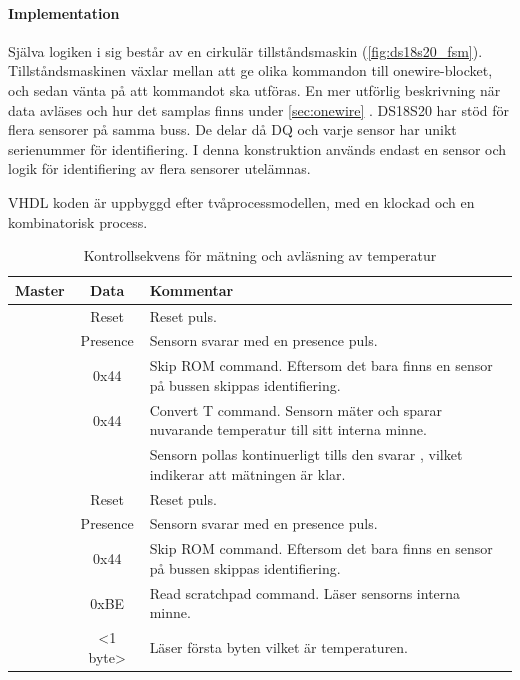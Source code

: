 \paragraph{Implementation}
Själva logiken i sig består av en cirkulär tillståndsmaskin (\autoref{fig:ds18s20_fsm}).
Tillståndsmaskinen växlar mellan att ge olika kommandon till onewire-blocket, och sedan vänta på att kommandot ska utföras. En mer utförlig beskrivning när data avläses och hur det samplas finns under \ref{sec:onewire} .
DS18S20 har stöd för flera sensorer på samma buss. De delar då DQ och varje sensor har unikt serienummer för identifiering. I denna konstruktion används endast en sensor och logik för identifiering av flera sensorer utelämnas.

VHDL koden är uppbyggd efter tvåprocessmodellen, med en klockad och en kombinatorisk process.


\begin{table}[H]

\begin{tabularx}{\textwidth}[h]{c c X}
	\hline
	\textbf{Master} & \textbf{Data} & \textbf{Kommentar} \\
	\hline

	\Tx & Reset & Reset puls.\\
	\Rx & Presence & Sensorn svarar med en presence puls.\\
	\Tx & 0x44 & Skip ROM command. Eftersom det bara finns en sensor på bussen skippas identifiering.\\
	\Tx & 0x44 & Convert T command. Sensorn mäter och sparar nuvarande temperatur till sitt interna minne.\\
	\Rx & & Sensorn pollas kontinuerligt tills den svarar \high{}, vilket indikerar att mätningen är klar.\\
	\Tx & Reset & Reset puls.\\
	\Rx & Presence & Sensorn svarar med en presence puls.\\
	\Tx & 0x44 & Skip ROM command. Eftersom det bara finns en sensor på bussen skippas identifiering.\\
	\Tx & 0xBE & Read scratchpad command. Läser sensorns interna minne.  \\
	\Rx & <1 byte> & Läser första byten vilket är temperaturen.\\

	\hline
\end{tabularx}
\caption{Kontrollsekvens för mätning och avläsning av temperatur}
\end{table}


